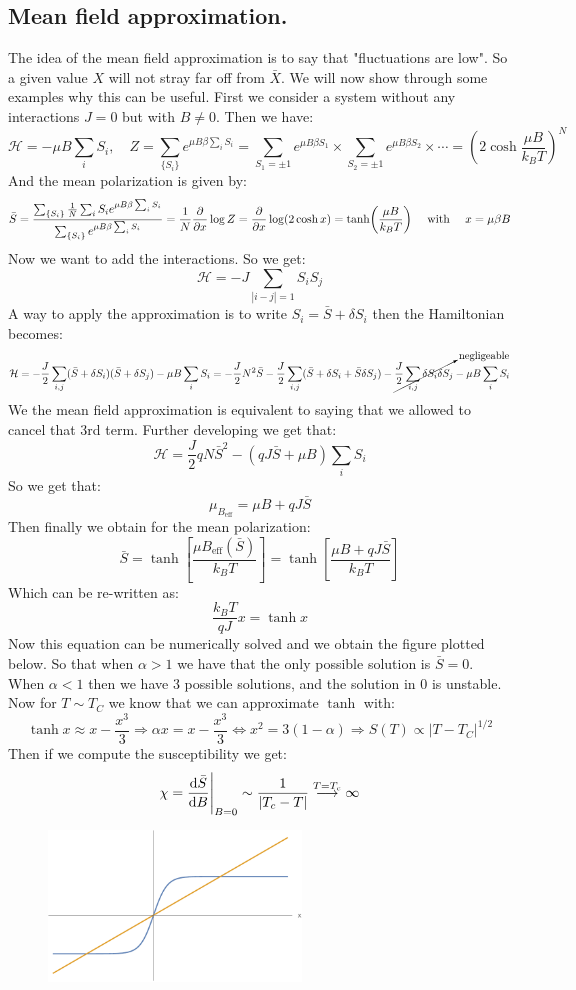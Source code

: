 \documentclass[10pt,a4paper]{book}
\begin{document}
\subsection{Mean field approximation.}
The idea of the mean field approximation is to say that "fluctuations are low". So a given value $X$ will not stray far off from $\bar{X}$. We will now show through some examples why this can be useful. First we consider a system without any interactions $J = 0$ but with $B \neq 0$. Then we have:
\[
\mathcal{H} = -\mu B \sum_i S_i, \quad Z = \sum_{\{S_i\}} e^{\mu B \beta \sum_i S_i} = \sum_{S_1 = \pm 1} e^{\mu B \beta S_1} \times \sum_{S_2 = \pm 1} e^{\mu B \beta S_2} \times \cdots = \left(2 \cosh \frac{\mu B}{k_B T}\right)^N
\]
And the mean polarization is given by:
\[
\bar{S} = \frac{\sum_{\{S_i\}} \frac{1}{N} \sum_i S_i e^{\mu B \beta \sum_i S_i}}{\sum_{\{S_i\}} e^{\mu B \beta \sum_i S_i}} =  \frac{1}{N} \pdv{}{x} \log Z = \pdv{}{x} \log(2 \cosh x) = \tanh(\frac{\mu B}{k_B T}) \quad \text{ with } \quad x = \mu \beta B
\]
Now we want to add the interactions. So we get:
\[
\mathcal{H} = - J \sum_{|i - j| = 1} S_i S_j
\]
A way to apply the approximation is to write $S_i = \bar S + \delta S_i$ then the Hamiltonian becomes:
\[
\mathcal{H} = - \frac{J}{2} \sum_{i,j} (\bar{S} + \delta S_i)(\bar{S} + \delta S_j) - \mu B \sum_i S_i = -\frac{J}{2}N^2 \bar{S} - \frac{J}{2}\sum_{i,j}(\bar{S} + \delta S_i + \bar{S} \delta S_j) - \cancelto{\text{negligeable}}{\frac{J}{2}\sum_{i,j} \delta S_i \delta S_j} - \mu B \sum_i S_i
\]
We the mean field approximation is equivalent to saying that we allowed to cancel that 3rd term. Further developing we get that:
\[
\mathcal{H} = \frac{J}{2} q N \bar{S}^2 - (q J \bar{S} + \mu B)\sum_i S_i
\]
So we get that:
\[
\mu_{B_\text{eff}} = \mu B + q J \bar{S}
\]
Then finally we obtain for the mean polarization:
\[
\bar{S} = \tanh\left[\frac{\mu B_\text{eff}(\bar{S})}{k_B T}\right]= \tanh\left[\frac{\mu B + q J \bar{S}}{k_B T}\right]
\]
Which can be re-written as:
\[
\frac{k_B T}{q J} x = \tanh x
\]
Now this equation can be numerically solved and we obtain the figure plotted below.
So that when $\alpha > 1$ we have that the only possible solution is $\bar{S} = 0$. When $\alpha < 1$ then we have 3 possible solutions, and the solution in 0 is unstable. Now for $T \sim T_C$ we know that we can approximate $\tanh$ with:
\[
\tanh x \approx x - \frac{x^3}{3} \Rightarrow \alpha x = x - \frac{x^3}{3} \Leftrightarrow x^2 = 3(1 - \alpha) \Rightarrow S(T) \propto |T - T_C|^{1/2}
\]
Then if we compute the susceptibility we get:
\[
\chi = \dv{\bar{S}}{B}\Bigg|_{B = 0} \sim \frac{1}{|T_c - T|} \stackrel{T = T_c}{\longrightarrow} \infty
\]
\begin{figure}[h!]
\centering
\includegraphics[width = 0.6\textwidth]{graphs/TanhLin_Cut}
\end{figure}
\end{document}
